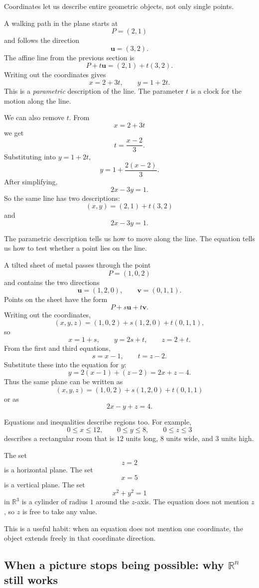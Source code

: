 Coordinates let us describe entire geometric objects, not only single points.

A walking path in the plane starts at
\[
    P=(2,1)
\]
and follows the direction
\[
    \mathbf u=(3,2).
\]
The affine line from the previous section is
\[
    P+t\mathbf u=(2,1)+t(3,2).
\]
Writing out the coordinates gives
\[
    x=2+3t,\qquad y=1+2t.
\]
This is a \emph{parametric} description of the line.  The parameter \(t\) is a clock for
the motion along the line.

We can also remove \(t\).  From
\[
    x=2+3t
\]
we get
\[
    t=\frac{x-2}{3}.
\]
Substituting into \(y=1+2t\),
\[
    y=1+\frac{2(x-2)}{3}.
\]
After simplifying,
\[
    2x-3y=1.
\]
So the same line has two descriptions:
\[
    \boxed{(x,y)=(2,1)+t(3,2)}
\]
and
\[
    \boxed{2x-3y=1.}
\]

The parametric description tells us how to move along the line.  The equation tells us
how to test whether a point lies on the line.

\begin{example}
A tilted sheet of metal passes through the point
\[
    P=(1,0,2)
\]
and contains the two directions
\[
    \mathbf u=(1,2,0), \qquad \mathbf v=(0,1,1).
\]
Points on the sheet have the form
\[
    P+s\mathbf u+t\mathbf v.
\]
Writing out the coordinates,
\[
    (x,y,z)
    =
    (1,0,2)+s(1,2,0)+t(0,1,1),
\]
so
\[
    x=1+s,\qquad y=2s+t,\qquad z=2+t.
\]
From the first and third equations,
\[
    s=x-1,\qquad t=z-2.
\]
Substitute these into the equation for \(y\):
\[
    y=2(x-1)+(z-2)=2x+z-4.
\]
Thus the same plane can be written as
\[
    \boxed{(x,y,z)=(1,0,2)+s(1,2,0)+t(0,1,1)}
\]
or as
\[
    \boxed{2x-y+z=4.}
\]
\end{example}

Equations and inequalities describe regions too.  For example,
\[
    0\leq x\leq 12,\qquad
    0\leq y\leq 8,\qquad
    0\leq z\leq 3
\]
describes a rectangular room that is \(12\) units long, \(8\) units wide, and \(3\) units
high.

The set
\[
    z=2
\]
is a horizontal plane.  The set
\[
    x=5
\]
is a vertical plane.  The set
\[
    x^2+y^2=1
\]
in \(\mathbb R^3\) is a cylinder of radius \(1\) around the \(z\)-axis.  The equation
does not mention \(z\), so \(z\) is free to take any value.

This is a useful habit: when an equation does not mention one coordinate, the object
extends freely in that coordinate direction.

\subsection{When a picture stops being possible: why \(\mathbb R^n\) still works}

